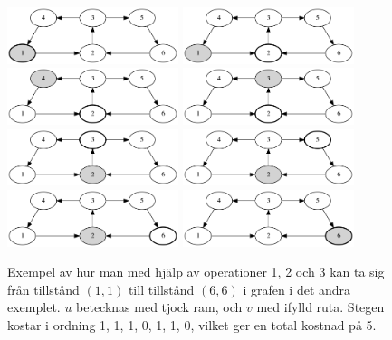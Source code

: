 \begin{figure}[!h]
\begin{center}
\includegraphics[width=5cm]{lampexempel1.png}
\includegraphics[width=5cm]{lampexempel2.png}
\includegraphics[width=5cm]{lampexempel3.png}
\includegraphics[width=5cm]{lampexempel4.png}
\includegraphics[width=5cm]{lampexempel5.png}
\includegraphics[width=5cm]{lampexempel6.png}
\includegraphics[width=5cm]{lampexempel7.png}
\includegraphics[width=5cm]{lampexempel8.png}
  \caption{Exempel av hur man med hjälp av operationer 1, 2 och 3 kan ta sig från tillstånd $(1,1)$ till tillstånd $(6,6)$ i grafen i det andra exemplet. $u$ betecknas med tjock ram, och $v$ med ifylld ruta.
  Stegen kostar i ordning 1, 1, 1, 0, 1, 1, 0, vilket ger en total kostnad på 5.}
  \label{fig:lampexempel}
\end{center}
\end{figure}
